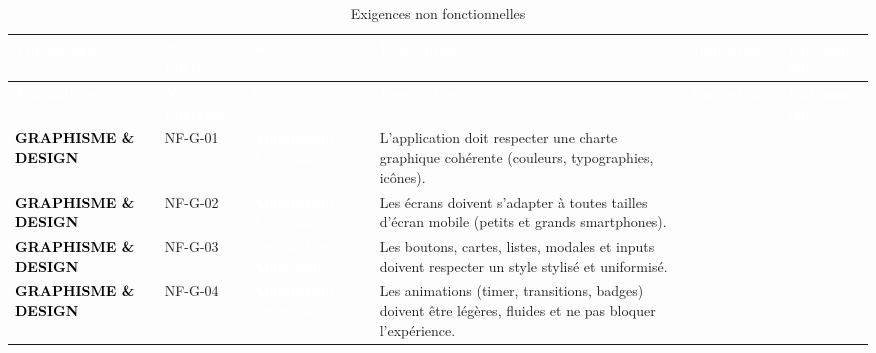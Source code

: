 
\begingroup
\scriptsize
\setlength{\tabcolsep}{3pt}
\renewcommand{\arraystretch}{1.28}
\begin{longtable}{|P{2.15cm}|P{1.55cm}|P{2.35cm}|P{5.60cm}|P{1.65cm}|P{1.45cm}|}
\caption{Exigences non fonctionnelles}\\
\hline
{}
\textcolor{white}{\textbf{Thématique}} & \textcolor{white}{\textbf{N° référence}} & \textcolor{white}{\textbf{Secteur}} & \textcolor{white}{\textbf{Description}} & \textcolor{white}{\textbf{Importance}} & \textcolor{white}{\textbf{Fait/non fait}} \\ \hline
\endfirsthead
\hline
{}
\textcolor{white}{\textbf{Thématique}} & \textcolor{white}{\textbf{N° référence}} & \textcolor{white}{\textbf{Secteur}} & \textcolor{white}{\textbf{Description}} & \textcolor{white}{\textbf{Importance}} & \textcolor{white}{\textbf{Fait/non fait}} \\ \hline
\endhead
{}
\textcolor{black}{\textbf{GRAPHISME \& DESIGN}} & NF-G-01 & \textcolor{white}{\textbf{Application Apprenant}} & L’application doit respecter une charte graphique cohérente (couleurs, typographies, icônes). &  &  \\ \hline
{}
\textcolor{black}{\textbf{GRAPHISME \& DESIGN}} & NF-G-02 & \textcolor{white}{\textbf{Application Apprenant}} & Les écrans doivent s’adapter à toutes tailles d’écran mobile (petits et grands smartphones). &  &  \\ \hline
{}
\textcolor{black}{\textbf{GRAPHISME \& DESIGN}} & NF-G-03 & \textcolor{white}{\textbf{Application Apprenant}} & Les boutons, cartes, listes, modales et inputs doivent respecter un style stylisé et uniformisé. &  &  \\ \hline
{}
\textcolor{black}{\textbf{GRAPHISME \& DESIGN}} & NF-G-04 & \textcolor{white}{\textbf{Application Apprenant}} & Les animations (timer, transitions, badges) doivent être légères, fluides et ne pas bloquer l’expérience. &  &  \\ \hline

\end{longtable}
